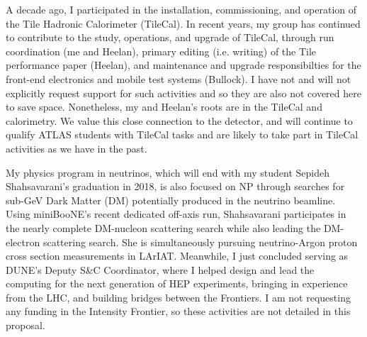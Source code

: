 A decade ago, I participated in the installation, commissioning, and
operation of the Tile Hadronic Calorimeter (TileCal). In recent years,
my group has continued to contribute to the study, operations, and
upgrade of TileCal, through run coordination (me and Heelan), primary
editing (i.e. writing) of the Tile performance paper (Heelan), and
maintenance and upgrade responsibilties for the front-end electronics
and mobile test systems (Bullock). I have not and will not explicitly
request support for such activities and so they are also not covered
here to save space. Nonetheless, my and Heelan's roots are in the
TileCal and calorimetry. We value this close connection to the
detector, and will continue to qualify ATLAS students with TileCal
tasks and are likely to take part in TileCal activities as we have in
the past.

My physics program in neutrinos, which will end with my student
Sepideh Shahsavarani's graduation in 2018, is also focused on NP
through searches for sub-GeV Dark Matter (DM) potentially produced in
the neutrino beamline. Using miniBooNE's recent dedicated off-axis
run, Shahsavarani participates in the nearly complete DM-nucleon
scattering search while also leading the DM-electron scattering
search. She is simultaneously pursuing neutrino-Argon proton cross
section measurements in LArIAT. Meanwhile, I just concluded serving as
DUNE's Deputy S\&C Coordinator, where I helped design and lead the
computing for the next generation of HEP experiments, bringing in
experience from the LHC, and building bridges between the Frontiers. I
am not requesting any funding in the Intensity Frontier, so these
activities are not detailed in this proposal. 

